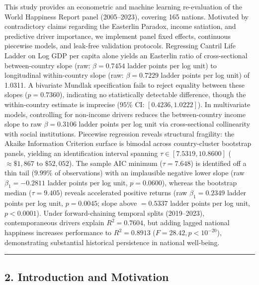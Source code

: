 \documentclass[
]{article}
\begin{document}
This study provides an econometric and machine learning re-evaluation of
the World Happiness Report panel (2005--2023), covering 165 nations.
Motivated by contradictory claims regarding the Easterlin Paradox,
income satiation, and predictive driver importance, we implement panel
fixed effects, continuous piecewise models, and leak-free validation
protocols. Regressing Cantril Life Ladder on Log GDP per capita alone
yields an Easterlin ratio of cross-sectional between-country slope (raw:
\(\beta = 0.7454\) ladder points per log unit) to longitudinal
within-country slope (raw: \(\beta = 0.7229\) ladder points per log
unit) of 1.0311. A bivariate Mundlak specification fails to reject
equality between these slopes (\(p = 0.7360\)), indicating no
statistically detectable difference, though the within-country estimate
is imprecise (\(95\% \text{ CI: } [0.4236, 1.0222]\)). In multivariate
models, controlling for non-income drivers reduces the between-country
income slope to raw \(\beta = 0.3106\) ladder points per log unit via
cross-sectional collinearity with social institutions. Piecewise
regression reveals structural fragility: the Akaike Information
Criterion surface is bimodal across country-cluster bootstrap panels,
yielding an identification interval spanning
\(\tau \in [7.5319, 10.8600]\) (\(\approx \$1,867\) to \(\$52,052\)).
The sample AIC minimum (\(\tau = 7.648\)) is identified off a thin tail
(\(9.99\%\) of observations) with an implausible negative lower slope
(raw \(\beta_1 = -0.2811\) ladder points per log unit, \(p = 0.0600\)),
whereas the bootstrap median (\(\tau = 9.405\)) reveals accelerated
positive returns (raw \(\beta_1 = 0.2349\) ladder points per log unit,
\(p = 0.0045\); slope above \(= 0.5337\) ladder points per log unit,
\(p < 0.0001\)). Under forward-chaining temporal splits (2019--2023),
contemporaneous drivers explain \(R^2 = 0.7604\), but adding lagged
national happiness increases performance to \(R^2 = 0.8913\)
(\(F = 28.42, p < 10^{-20}\)), demonstrating substantial historical
persistence in national well-being.

\begin{center}\rule{0.5\linewidth}{0.5pt}\end{center}

\hypertarget{introduction-and-motivation}{%
\subsection{2. Introduction and
Motivation}\label{introduction-and-motivation}}
\end{document}
